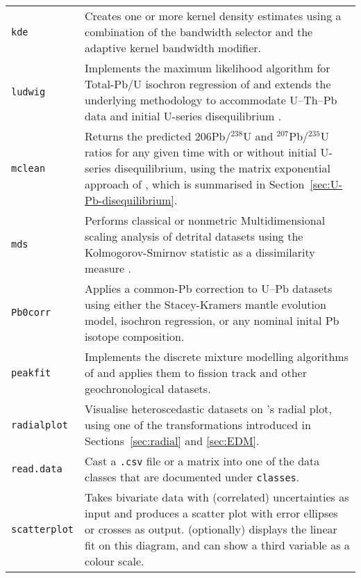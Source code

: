 \begin{refsection}
\begin{longtable}{@{}p{.25\linewidth}@{}p{.75\linewidth}@{}}
\texttt{kde} & Creates one or more kernel density estimates using a
combination of the \citet{botev2010} bandwidth selector and the
\citet{abramson1982} adaptive kernel bandwidth modifier.\\

\texttt{ludwig} & Implements the maximum likelihood algorithm for
Total-Pb/U isochron regression of \citet{ludwig1998} and extends the
underlying methodology to accommodate U--Th--Pb data
\citep{vermeesch2021} and initial U-series disequilibrium
\citep{mclean2016b}.\\

\texttt{mclean} & Returns the predicted ${206}$Pb/$^{238}$U and
$^{207}$Pb/$^{235}$U ratios for any given time with or without initial
U-series disequilibrium, using the matrix exponential approach of
\citet{mclean2016b}, which is summarised in
Section~\ref{sec:U-Pb-disequilibrium}. \\

\texttt{mds} & Performs classical or nonmetric Multidimensional
scaling analysis of detrital datasets using the Kolmogorov-Smirnov
statistic as a dissimilarity measure \citep{vermeesch2013}.\\

\texttt{Pb0corr} & Applies a common-Pb correction to U--Pb datasets
using either the Stacey-Kramers mantle evolution model, isochron
regression, or any nominal inital Pb isotope composition.\\

\texttt{peakfit} & Implements the discrete mixture modelling
algorithms of \citet{galbraith1993} and applies them to fission track
and other geochronological datasets.\\

\texttt{radialplot} & Visualise heteroscedastic datasets on
\citet{galbraith1988}'s radial plot, using one of the transformations
introduced in Sections~\ref{sec:radial} and \ref{sec:EDM}.\\

\texttt{read.data} & Cast a \texttt{.csv} file or a matrix into one of
the data classes that are documented under \texttt{classes}.\\

\texttt{scatterplot} & Takes bivariate data with (correlated)
uncertainties as input and produces a scatter plot with error ellipses
or crosses as output.  (optionally) displays the linear fit on this
diagram, and can show a third variable as a colour scale.\\


\end{longtable}
\end{refsection}
